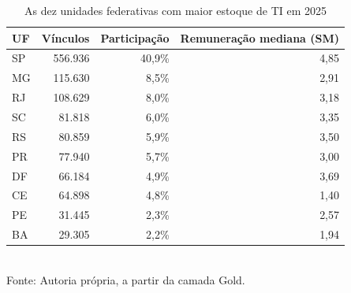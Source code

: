 \begin{table}[htbp]
    \centering
    \caption{As dez unidades federativas com maior estoque de TI em 2025}
    \label{tab:uf}
    \footnotesize
    \renewcommand{\arraystretch}{1.25}
    \begin{tabular}{lrrr}
        \toprule
        \rowcolor{black!8}
        \textbf{UF} & \textbf{Vínculos} & \textbf{Participação} & \textbf{Remuneração mediana (SM)} \\
        \midrule
        SP & 556.936 & 40,9\% & 4,85 \\
        MG & 115.630 & 8,5\% & 2,91 \\
        RJ & 108.629 & 8,0\% & 3,18 \\
        SC & 81.818 & 6,0\% & 3,35 \\
        RS & 80.859 & 5,9\% & 3,50 \\
        PR & 77.940 & 5,7\% & 3,00 \\
        DF & 66.184 & 4,9\% & 3,69 \\
        CE & 64.898 & 4,8\% & 1,40 \\
        PE & 31.445 & 2,3\% & 2,57 \\
        BA & 29.305 & 2,2\% & 1,94 \\
        \bottomrule
    \end{tabular}
    \\[4pt]
    Fonte: Autoria própria, a partir da camada Gold.
\end{table}
